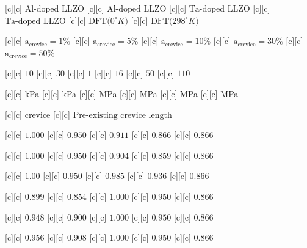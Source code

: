 [c][c] {$\text{Al-doped LLZO}$}
[c][c] {$\text{Al-doped LLZO}$}
[c][c] {$\text{Ta-doped LLZO}$}
[c][c] {$\text{Ta-doped LLZO}$}
[c][c] {$\text{DFT($0^{\circ}K$)}$}
[c][c] {$\text{DFT($298^{\circ}K$)}$}

[c][c] {\footnotesize $\text{a}_{\text{crevice}}\!=1\%$}
[c][c] {\footnotesize $\text{a}_{\text{crevice}}\!=5\%$}
[c][c] {\footnotesize $\text{a}_{\text{crevice}}\!=10\%$}
[c][c] {\footnotesize $\text{a}_{\text{crevice}}\!=30\%$}
[c][c] {\footnotesize $\text{a}_{\text{crevice}}\!=50\%$}

[c][c] {\footnotesize $10$}
[c][c] {\footnotesize $30$}
[c][c] {\footnotesize $1$}
[c][c] {\footnotesize $16$}
[c][c] {\footnotesize $50$}
[c][c] {\footnotesize $110$}

[c][c] {\footnotesize kPa}
[c][c] {\footnotesize kPa}
[c][c] {\footnotesize MPa}
[c][c] {\footnotesize MPa}
[c][c] {\footnotesize MPa}
[c][c] {\footnotesize MPa}

[c][c] {$\text{crevice}$}
[c][c] {$\text{Pre-existing crevice length}$}

[c][c] {\tiny $1.000$}
[c][c] {\tiny $0.950$}
[c][c] {\tiny $0.911$}
[c][c] {\tiny $0.866$}
[c][c] {\tiny $0.866$}

[c][c] {\tiny $1.000$}
[c][c] {\tiny $0.950$}
[c][c] {\tiny $0.904$}
[c][c] {\tiny $0.859$}
[c][c] {\tiny $0.866$}

[c][c] {\tiny $1.00$}
[c][c] {\tiny $0.950$}
[c][c] {\tiny $0.985$}
[c][c] {\tiny $0.936$}
[c][c] {\tiny $0.866$}

[c][c] {\tiny $0.899$}
[c][c] {\tiny $0.854$}
[c][c] {\tiny $1.000$}
[c][c] {\tiny $0.950$}
[c][c] {\tiny $0.866$}

[c][c] {\tiny $0.948$}
[c][c] {\tiny $0.900$}
[c][c] {\tiny $1.000$}
[c][c] {\tiny $0.950$}
[c][c] {\tiny $0.866$}

[c][c] {\tiny $0.956$}
[c][c] {\tiny $0.908$}
[c][c] {\tiny $1.000$}
[c][c] {\tiny $0.950$}
[c][c] {\tiny $0.866$}

